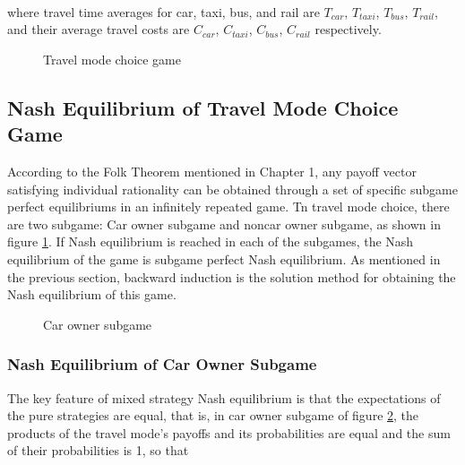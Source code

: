 \paragraph{}where travel time averages for car, taxi, bus, and rail are $T_{car}$, $T_{taxi}$, $T_{bus}$, $T_{rail}$, and their average travel costs are $C_{car}$, $C_{taxi}$, $C_{bus}$, $C_{rail}$ respectively.
\begin{figure}
 
  \centering
  \caption{Travel mode choice game\label{fig:2}}
\end{figure}
\subsection{Nash Equilibrium of Travel Mode Choice Game}
According to the Folk Theorem mentioned in Chapter 1, any payoff vector satisfying individual rationality can be obtained through a set of specific subgame perfect equilibriums in an infinitely repeated game. Tn travel mode choice, there are two subgame: Car owner subgame and noncar owner subgame, as shown in figure \ref{fig:2}. If Nash equilibrium is reached in each of the subgames, the Nash equilibrium of the game is subgame perfect Nash equilibrium. As mentioned in the previous section, backward induction is the solution method for obtaining the Nash equilibrium of this game.
\begin{figure}
  \centering
  \caption{Car owner subgame\label{fig:3}}
\end{figure}
\subsubsection{Nash Equilibrium of Car Owner Subgame}The key feature of mixed strategy Nash equilibrium is that the expectations of the pure strategies are equal, that is, in car owner subgame of figure \ref{fig:3}, the products of the travel mode's payoffs and its probabilities are equal and the sum of their probabilities is 1, so that 

